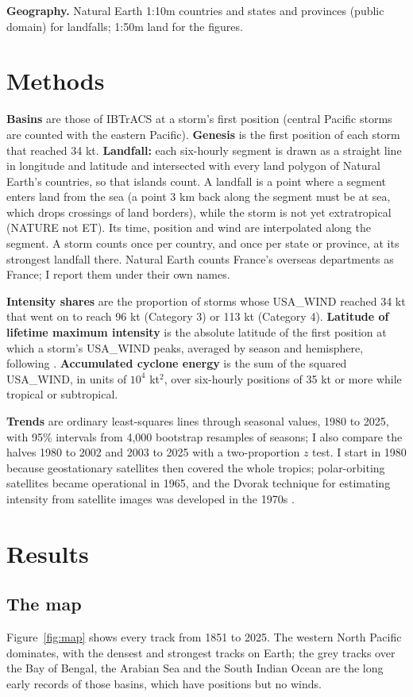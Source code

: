 \documentclass[11pt,a4paper]{article}
\begin{document}
\textbf{Geography.} Natural Earth 1:10m countries and states and provinces (public domain) for landfalls; 1:50m land for the figures.

\section{Methods}
\textbf{Basins} are those of IBTrACS at a storm's first position (central Pacific storms are counted with the eastern Pacific). \textbf{Genesis} is the first position of each storm that reached 34 kt. \textbf{Landfall:} each six-hourly segment is drawn as a straight line in longitude and latitude and intersected with every land polygon of Natural Earth's countries, so that islands count. A landfall is a point where a segment enters land from the sea (a point 3 km back along the segment must be at sea, which drops crossings of land borders), while the storm is not yet extratropical (NATURE not ET). Its time, position and wind are interpolated along the segment. A storm counts once per country, and once per state or province, at its strongest landfall there. Natural Earth counts France's overseas departments as France; I report them under their own names.

\textbf{Intensity shares} are the proportion of storms whose USA\_WIND reached 34 kt that went on to reach 96 kt (Category 3) or 113 kt (Category 4). \textbf{Latitude of lifetime maximum intensity} is the absolute latitude of the first position at which a storm's USA\_WIND peaks, averaged by season and hemisphere, following \citet{kossin2014}. \textbf{Accumulated cyclone energy} is the sum of the squared USA\_WIND, in units of $10^4$ kt$^2$, over six-hourly positions of 35 kt or more while tropical or subtropical.

\textbf{Trends} are ordinary least-squares lines through seasonal values, 1980 to 2025, with 95\% intervals from 4,000 bootstrap resamples of seasons; I also compare the halves 1980 to 2002 and 2003 to 2025 with a two-proportion $z$ test. I start in 1980 because geostationary satellites then covered the whole tropics; polar-orbiting satellites became operational in 1965, and the Dvorak technique for estimating intensity from satellite images was developed in the 1970s \citep{wikitc}.

\section{Results}
\subsection{The map}
Figure~\ref{fig:map} shows every track from 1851 to 2025. The western North Pacific dominates, with the densest and strongest tracks on Earth; the grey tracks over the Bay of Bengal, the Arabian Sea and the South Indian Ocean are the long early records of those basins, which have positions but no winds.
\end{document}
